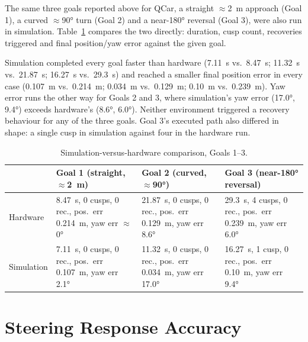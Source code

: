 The same three goals reported above for QCar, a straight
$\approx$\SI{2}{\meter} approach (Goal 1), a curved
$\approx$\ang{90} turn (Goal 2) and a near-\ang{180} reversal (Goal 3),
were also run in simulation. Table~\ref{tab:results-sim-vs-real}
compares the two directly: duration, cusp count, recoveries triggered
and final position/yaw error against the given goal.

Simulation completed every goal faster than hardware (\SI{7.11}{\second}
vs.\ \SI{8.47}{\second}; \SI{11.32}{\second} vs.\ \SI{21.87}{\second};
\SI{16.27}{\second} vs.\ \SI{29.3}{\second}) and reached a smaller
final position error in every case (\SI{0.107}{\meter} vs.\
\SI{0.214}{\meter}; \SI{0.034}{\meter} vs.\ \SI{0.129}{\meter};
\SI{0.10}{\meter} vs.\ \SI{0.239}{\meter}). Yaw error runs the other
way for Goals 2 and 3, where simulation's yaw error (\ang{17.0},
\ang{9.4}) exceeds hardware's (\ang{8.6}, \ang{6.0}). Neither
environment triggered a recovery behaviour for any of the three goals.
Goal 3's executed path also differed in shape: a single cusp in
simulation against four in the hardware run.

\begin{table}[htbp]
  \centering
  \small
  \caption{Simulation-versus-hardware comparison, Goals 1--3.}
  \label{tab:results-sim-vs-real}
  \begin{tabular}{@{}lp{3.7cm}p{3.7cm}p{3.7cm}@{}}
    \toprule
    & Goal 1 (straight, $\approx$\SI{2}{\meter}) & Goal 2 (curved, $\approx$\ang{90}) & Goal 3 (near-\ang{180} reversal) \\
    \midrule
    Hardware & \SI{8.47}{\second}, 0 cusps, 0 rec., pos.\ err \SI{0.214}{\meter}, yaw err $\approx$\ang{0} & \SI{21.87}{\second}, 0 cusps, 0 rec., pos.\ err \SI{0.129}{\meter}, yaw err \ang{8.6} & \SI{29.3}{\second}, 4 cusps, 0 rec., pos.\ err \SI{0.239}{\meter}, yaw err \ang{6.0} \\
    Simulation & \SI{7.11}{\second}, 0 cusps, 0 rec., pos.\ err \SI{0.107}{\meter}, yaw err \ang{2.1} & \SI{11.32}{\second}, 0 cusps, 0 rec., pos.\ err \SI{0.034}{\meter}, yaw err \ang{17.0} & \SI{16.27}{\second}, 1 cusp, 0 rec., pos.\ err \SI{0.10}{\meter}, yaw err \ang{9.4} \\
    \bottomrule
  \end{tabular}
\end{table}

\section{Steering Response Accuracy}
\label{sec:results-steering}

